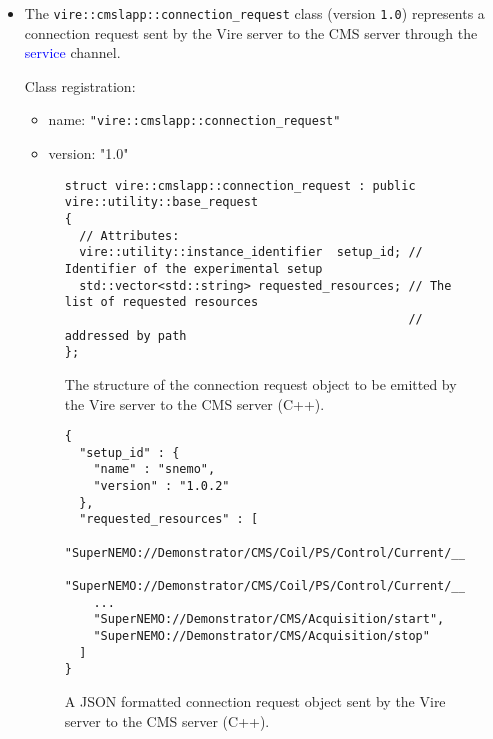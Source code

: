 \begin{itemize}

\item   The   \texttt{vire::cmslapp::connection\_request}   class
  (version \texttt{1.0})  represents a connection request  sent by the
  Vire server to the  CMS server through the \textcolor{blue}{service}
  channel.

\begin{center}
\end{center}

\noindent Class registration:
\begin{itemize}
\item name: \texttt{"vire::cmslapp::connection\_request"}
\item version: "1.0"
\end{itemize}

\begin{figure}[h]
\vskip 10pt
\small
\begin{Verbatim}[frame=single,xleftmargin=0.cm,label=\fbox{C++}]
struct vire::cmslapp::connection_request : public vire::utility::base_request
{
  // Attributes:
  vire::utility::instance_identifier  setup_id; // Identifier of the experimental setup
  std::vector<std::string> requested_resources; // The list of requested resources
                                                // addressed by path
};
\end{Verbatim}
\normalsize
\caption{The structure of the connection  request object to be emitted
  by the Vire server to the CMS server (C++).}
\label{fig-app-payload-connection_request}
\end{figure}

\begin{figure}[h]
\vskip 10pt
\small
\begin{Verbatim}[frame=single,xleftmargin=0.cm,label=\fbox{JSON}]
{
  "setup_id" : {
    "name" : "snemo",
    "version" : "1.0.2"
  },
  "requested_resources" : [
    "SuperNEMO://Demonstrator/CMS/Coil/PS/Control/Current/__dp_read__",
    "SuperNEMO://Demonstrator/CMS/Coil/PS/Control/Current/__dp_write__",
    ...
    "SuperNEMO://Demonstrator/CMS/Acquisition/start",
    "SuperNEMO://Demonstrator/CMS/Acquisition/stop"
  ]
}
\end{Verbatim}
\normalsize
\caption{A JSON formatted  connection request object sent  by the Vire
  server to the CMS server (C++).}
\label{fig-app-payload-connection_request-json}
\end{figure}



\end{itemize}
